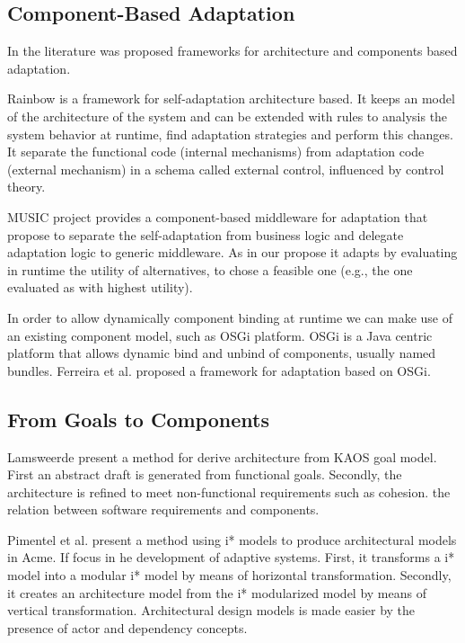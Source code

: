 \subsection{Component-Based Adaptation}

In the literature was proposed frameworks for architecture and components based adaptation.

Rainbow\cite{garlan_rainbow:_2004} is a framework for self-adaptation architecture based. It keeps an model of the architecture of the system and can be extended with rules to analysis the system behavior at runtime, find adaptation strategies and perform this changes. It separate the functional code (internal mechanisms) from adaptation code (external mechanism) in a schema called external control, influenced by control theory.

MUSIC\cite{rouvoy_music:_2009} project provides a component-based middleware for adaptation that propose to separate the self-adaptation from business logic and delegate adaptation logic to generic middleware. As in our propose it adapts by evaluating in runtime the utility of alternatives, to chose a feasible one (e.g., the one evaluated as with highest utility).

In order to allow dynamically component binding at runtime we can make use of an existing component model, such as OSGi platform\cite{the_osgi_alliance_osgi_2007}. OSGi is a Java centric platform that allows dynamic bind and unbind of components, usually named bundles. Ferreira et al.\cite{ferreira_-osgi:_2012} proposed a framework for adaptation based on OSGi.

\subsection{From Goals to Components}

Lamsweerde \cite{van_lamsweerde_system_2003} present a method for derive architecture from KAOS goal model. First an abstract draft is generated from functional goals. Secondly, the architecture is refined to meet non-functional requirements such as cohesion.   the relation between software requirements and components.

Pimentel et al. \cite{pimentel_deriving_2012} present a method  using i* models to produce architectural models in Acme. If focus in he development of adaptive systems. First, it transforms a i* model into a modular i* model by means of horizontal transformation. Secondly, it creates an architecture model from the i* modularized model by means of vertical transformation. Architectural design models is made easier by the
presence of actor and dependency concepts.

